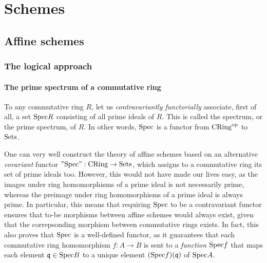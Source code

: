 \chapter{Schemes} \label{chapter: schemes}
    \begin{abstract}
        
    \end{abstract}
    
    \minitoc

    \section{Affine schemes}
        \subsection{The logical approach}
            \subsubsection{The prime spectrum of a commutative ring} \index{$\Spec$}
                \begin{definition}
                    To any commutative ring $R$, let us \textit{contravariantly functorially} associate, first of all, a set $\mathrm{Spec} R$ consisting of all prime ideals of $R$. This is called the spectrum, or the prime spectrum, of $R$. In other words, $\Spec$ is a functor from $\mathrm{CRing}^{\mathrm{op}}$ to $\mathrm{Sets}$.
                \end{definition}
                \begin{remark}
                    One can very well construct the theory of affine schemes based on an alternative \textit{covariant} functor $"\mathrm{Spec}": \mathrm{CRing} \to \mathrm{Sets}$, which assigns to a commutative ring its set of prime ideals too. However, this would not have made our lives easy, as the images under ring homomorphisms of a prime ideal is not necessarily prime, whereas the preimage under ring homomorphisms of a prime ideal is always prime. In particular, this means that requiring $\Spec$ to be a contravariant functor ensures that to-be morphisms between affine schemes would always exist, given that the correpsonding morphism between commutative rings exists. In fact, this also proves that $\Spec$ is a well-defined functor, as it guarantees that each commutative ring homomorphism $f: A \to B$ is sent to a \textit{function} $\mathrm{Spec} f$ that maps each element $\mathfrak{q} \in \mathrm{Spec} B$ to a unique element $(\mathrm{Spec} f)(\mathfrak{q})$ of $\mathrm{Spec} A$.
                \end{remark}
